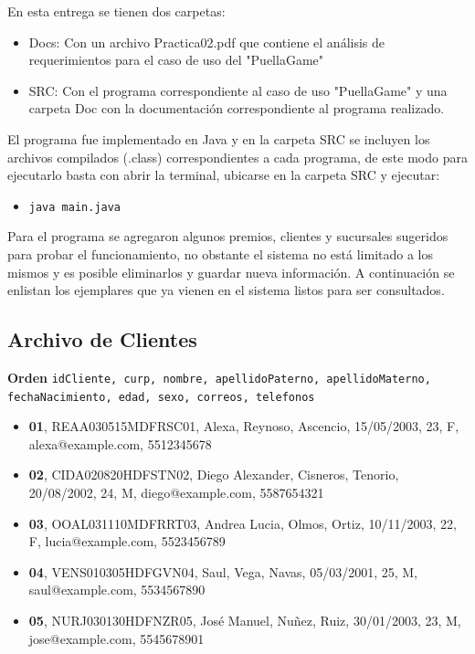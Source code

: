 \documentclass[12pt]{article}
\begin{document}
En esta entrega se tienen dos carpetas:
\begin{itemize}
    \item Docs: Con un archivo Practica02.pdf que contiene el análisis de requerimientos para el caso de uso del "PuellaGame"
    \item SRC: Con el programa correspondiente al caso de uso "PuellaGame" y una carpeta Doc con la documentación correspondiente al programa realizado.
\end{itemize}
El programa fue implementado en Java y en la carpeta SRC se incluyen los archivos compilados (.class) correspondientes a cada programa, de este modo para ejecutarlo basta con abrir la terminal, ubicarse en la carpeta SRC y ejecutar:
\begin{itemize}
    \item \texttt{java main.java}
\end{itemize}
Para el programa se agregaron algunos premios, clientes y sucursales sugeridos para probar el funcionamiento, no obstante el sistema no está limitado a los mismos y es posible eliminarlos y guardar nueva información. A continuación se enlistan los ejemplares que ya vienen en el sistema listos para ser consultados.\\

\subsection*{Archivo de Clientes}
\textbf{Orden} \texttt{idCliente, curp, nombre, apellidoPaterno, apellidoMaterno, fechaNacimiento, edad, sexo, correos, telefonos}
\begin{itemize}
    \item \textbf{01}, REAA030515MDFRSC01, Alexa, Reynoso, Ascencio, 15/05/2003, 23, F, alexa@example.com, 5512345678
    \item \textbf{02}, CIDA020820HDFSTN02, Diego Alexander, Cisneros, Tenorio, 20/08/2002, 24, M, diego@example.com, 5587654321
    \item \textbf{03}, OOAL031110MDFRRT03, Andrea Lucia, Olmos, Ortiz, 10/11/2003, 22, F, lucia@example.com, 5523456789
    \item \textbf{04}, VENS010305HDFGVN04, Saul, Vega, Navas, 05/03/2001, 25, M, saul@example.com, 5534567890
    \item \textbf{05}, NURJ030130HDFNZR05, José Manuel, Nuñez, Ruiz, 30/01/2003, 23, M, jose@example.com, 5545678901
\end{itemize}
\end{document}
